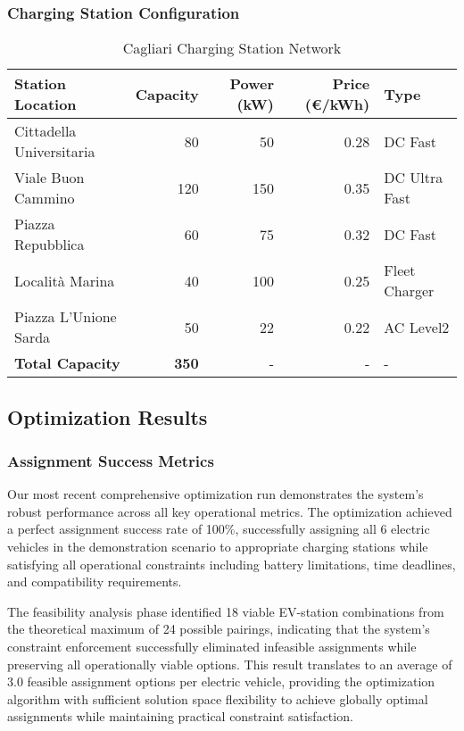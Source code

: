 \documentclass[12pt,a4paper]{article}
\begin{document}
\subsubsection{Charging Station Configuration}

\begin{table}[h]
\centering
\caption{Cagliari Charging Station Network}
\begin{tabular}{@{}lrrrl@{}}
\toprule
Station Location & Capacity & Power (kW) & Price (€/kWh) & Type \\
\midrule
Cittadella Universitaria & 80 & 50 & 0.28 & DC Fast \\
Viale Buon Cammino & 120 & 150 & 0.35 & DC Ultra Fast \\
Piazza Repubblica & 60 & 75 & 0.32 & DC Fast \\
Località Marina & 40 & 100 & 0.25 & Fleet Charger \\
Piazza L'Unione Sarda & 50 & 22 & 0.22 & AC Level2 \\
\midrule
\textbf{Total Capacity} & \textbf{350} & - & - & - \\
\bottomrule
\end{tabular}
\end{table}

\subsection{Optimization Results}

\subsubsection{Assignment Success Metrics}
Our most recent comprehensive optimization run demonstrates the system's robust performance across all key operational metrics. The optimization achieved a perfect assignment success rate of 100\%, successfully assigning all 6 electric vehicles in the demonstration scenario to appropriate charging stations while satisfying all operational constraints including battery limitations, time deadlines, and compatibility requirements.

The feasibility analysis phase identified 18 viable EV-station combinations from the theoretical maximum of 24 possible pairings, indicating that the system's constraint enforcement successfully eliminated infeasible assignments while preserving all operationally viable options. This result translates to an average of 3.0 feasible assignment options per electric vehicle, providing the optimization algorithm with sufficient solution space flexibility to achieve globally optimal assignments while maintaining practical constraint satisfaction.
\end{document}
